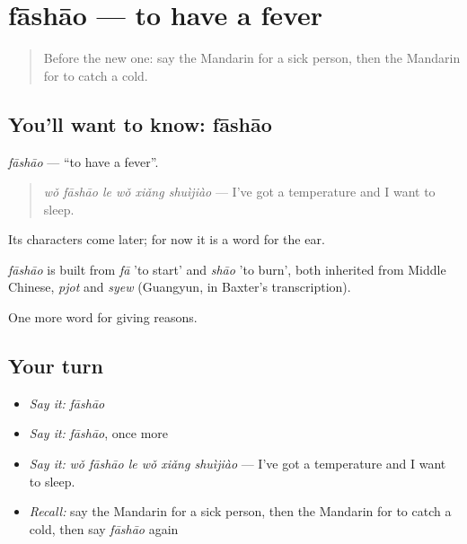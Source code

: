 \section[fāshāo]{fāshāo — to have a fever}

\label{lesson:ZH-C130-fashao}



\begin{quote}
Before the new one: say the Mandarin for a sick person, then the Mandarin for to catch a cold.
\end{quote}

\subsection*{You'll want to know: fāshāo}
\emph{fāshāo} — \textquotedblleft{}to have a fever\textquotedblright{}.

\begin{quote}
\emph{wǒ fāshāo le wǒ xiǎng shuìjiào} — I've got a temperature and I want to sleep.
\end{quote}

Its characters come later; for now it is a word for the ear.

\begin{cousinweb}
\emph{fāshāo} is built from \emph{fā} 'to start' and \emph{shāo} 'to burn', both inherited from Middle Chinese, \emph{pjot} and \emph{syew} (Guangyun, in Baxter's transcription).
\end{cousinweb}

\begin{grammarlens}[title={What you've built}]
One more word for giving reasons.
\end{grammarlens}

\subsection*{Your turn}
\begin{itemize}
\raggedright
  \item \emph{Say it:} \emph{fāshāo}
  \item \emph{Say it:} \emph{fāshāo}, once more
  \item \emph{Say it:} \emph{wǒ fāshāo le wǒ xiǎng shuìjiào} — I've got a temperature and I want to sleep.
  \item \emph{Recall:} say the Mandarin for a sick person, then the Mandarin for to catch a cold, then say \emph{fāshāo} again
\end{itemize}

